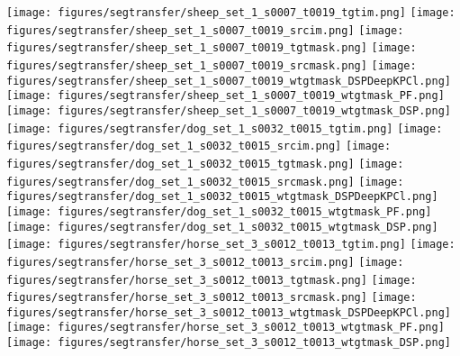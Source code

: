 \documentclass[10pt,twocolumn,letterpaper]{article}
\begin{document}
\begin{figure*}[t]
\begin{minipage}{0.538\linewidth}
\begin{center}
  \texttt{[image: figures/segtransfer/sheep\_set\_1\_s0007\_t0019\_tgtim.png]}
  \texttt{[image: figures/segtransfer/sheep\_set\_1\_s0007\_t0019\_srcim.png]}
  \texttt{[image: figures/segtransfer/sheep\_set\_1\_s0007\_t0019\_tgtmask.png]}
  \texttt{[image: figures/segtransfer/sheep\_set\_1\_s0007\_t0019\_srcmask.png]}
  \texttt{[image: figures/segtransfer/sheep\_set\_1\_s0007\_t0019\_wtgtmask\_DSPDeepKPCl.png]}
  \texttt{[image: figures/segtransfer/sheep\_set\_1\_s0007\_t0019\_wtgtmask\_PF.png]}
  \texttt{[image: figures/segtransfer/sheep\_set\_1\_s0007\_t0019\_wtgtmask\_DSP.png]}
\\

  \texttt{[image: figures/segtransfer/dog\_set\_1\_s0032\_t0015\_tgtim.png]}
  \texttt{[image: figures/segtransfer/dog\_set\_1\_s0032\_t0015\_srcim.png]}
  \texttt{[image: figures/segtransfer/dog\_set\_1\_s0032\_t0015\_tgtmask.png]}
  \texttt{[image: figures/segtransfer/dog\_set\_1\_s0032\_t0015\_srcmask.png]}
  \texttt{[image: figures/segtransfer/dog\_set\_1\_s0032\_t0015\_wtgtmask\_DSPDeepKPCl.png]}
  \texttt{[image: figures/segtransfer/dog\_set\_1\_s0032\_t0015\_wtgtmask\_PF.png]}
  \texttt{[image: figures/segtransfer/dog\_set\_1\_s0032\_t0015\_wtgtmask\_DSP.png]}
\\

  \texttt{[image: figures/segtransfer/horse\_set\_3\_s0012\_t0013\_tgtim.png]}
  \texttt{[image: figures/segtransfer/horse\_set\_3\_s0012\_t0013\_srcim.png]}
  \texttt{[image: figures/segtransfer/horse\_set\_3\_s0012\_t0013\_tgtmask.png]}
  \texttt{[image: figures/segtransfer/horse\_set\_3\_s0012\_t0013\_srcmask.png]}
  \texttt{[image: figures/segtransfer/horse\_set\_3\_s0012\_t0013\_wtgtmask\_DSPDeepKPCl.png]}
  \texttt{[image: figures/segtransfer/horse\_set\_3\_s0012\_t0013\_wtgtmask\_PF.png]}
  \texttt{[image: figures/segtransfer/horse\_set\_3\_s0012\_t0013\_wtgtmask\_DSP.png]}
\\


\end{center}
\end{minipage}
\end{figure*}
\end{document}
